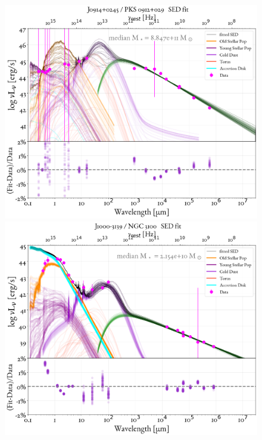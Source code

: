 \begin{figure}
    \centering
    \includegraphics[width=0.85\linewidth]{figures/ResultFits/30_SEDfit_2108.png}\\
    \includegraphics[width=0.85\linewidth]{figures/ResultFits/35_SEDfit_3076.png}   
\end{figure}
